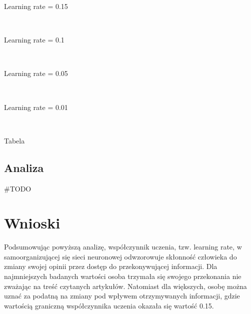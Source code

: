 \documentclass[11pt]{article}
\begin{document}
    \newpage
    Learning rate = 0.15

    \begin{center}
    \end{center}
    { \hspace*{\fill} \\}

    \newpage
    Learning rate = 0.1

    \begin{center}
    \end{center}
    { \hspace*{\fill} \\}

    \newpage
    Learning rate = 0.05

    \begin{center}
    \end{center}
    { \hspace*{\fill} \\}

    \newpage
    Learning rate = 0.01

    \begin{center}
    \end{center}
    { \hspace*{\fill} \\}
    \newpage
    
    Tabela

    \newpage

    \subsection*{Analiza}

    \#TODO

    \section*{Wnioski}

Podsumowując powyższą analizę, współczynnik uczenia, tzw. learning rate, w samoorganizującej się sieci neuronowej odwzorowuje skłonność człowieka do zmiany swojej opinii przez dostęp do przekonywującej informacji. Dla najmniejszych badanych wartości osoba trzymała się swojego przekonania nie zważając na treść czytanych artykułów. Natomiast dla większych, osobę można uznać za podatną na zmiany pod wpływem otrzymywanych informacji, gdzie wartością graniczną współczynnika uczenia okazała się wartość 0.15.
\end{document}
